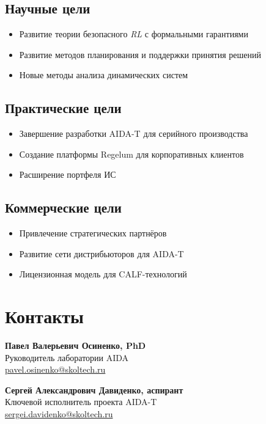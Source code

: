 \documentclass[12pt,a4paper]{article}
\begin{document}
\subsection*{Научные цели}
\begin{itemize}
    \item Развитие теории безопасного \textit{RL} с формальными гарантиями
    \item Развитие методов планирования и поддержки принятия решений
    \item Новые методы анализа динамических систем
\end{itemize}

\subsection*{Практические цели}
\begin{itemize}
    \item Завершение разработки AIDA-T для серийного производства
    \item Создание платформы Regelum для корпоративных клиентов
    \item Расширение портфеля ИС
\end{itemize}

\subsection*{Коммерческие цели}
\begin{itemize}
    \item Привлечение стратегических партнёров
    \item Развитие сети дистрибьюторов для AIDA-T
    \item Лицензионная модель для CALF-технологий
\end{itemize}

\section{Контакты}
\textbf{Павел Валерьевич Осиненко, PhD}\\
    \indent Руководитель лаборатории AIDA\\
    \indent \href{mailto:pavel.osinenko@skoltech.ru}{pavel.osinenko@skoltech.ru}

\vspace{10pt}
\noindent \textbf{Сергей Александрович Давиденко, аспирант}\\
    \indent Ключевой исполнитель проекта AIDA-T\\
    \indent \href{mailto:sergei.davidenko@skoltech.ru}{sergei.davidenko@skoltech.ru}
\end{document}
